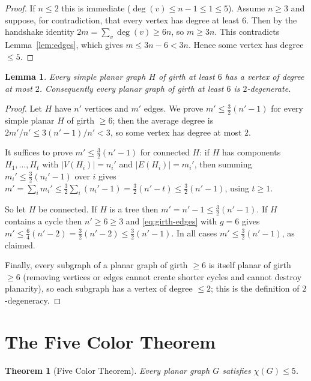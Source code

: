\documentclass{amsart}
\newtheorem{theorem}{Theorem}
\newtheorem{lemma}{Lemma}
\theoremstyle{remark}
\begin{document}
\begin{proof}
If $n\le2$ this is immediate ($\deg(v)\le n-1\le1\le5$). Assume $n\ge3$ and
suppose, for contradiction, that every vertex has degree at least $6$. Then by the
handshake identity $2m=\sum_{v}\deg(v)\ge 6n$, so $m\ge 3n$. This contradicts
Lemma~\ref{lem:edges}, which gives $m\le 3n-6<3n$. Hence some vertex has degree
$\le5$.
\end{proof}

\begin{lemma}\label{lem:girth6deg}
Every simple planar graph $H$ of girth at least $6$ has a vertex of degree at
most $2$. Consequently every planar graph of girth at least $6$ is
$2$-degenerate.
\end{lemma}

\begin{proof}
Let $H$ have $n'$ vertices and $m'$ edges. We prove $m' \le \tfrac32(n'-1)$ for
every simple planar $H$ of girth $\ge6$; then the average degree is
$2m'/n' \le 3(n'-1)/n' < 3$, so some vertex has degree at most $2$.

It suffices to prove $m'\le\tfrac32(n'-1)$ for connected $H$: if $H$ has
components $H_1,\dots,H_t$ with $|V(H_i)|=n_i'$ and $|E(H_i)|=m_i'$, then summing
$m_i'\le\tfrac32(n_i'-1)$ over $i$ gives
$m'=\sum_i m_i'\le \tfrac32\sum_i(n_i'-1)=\tfrac32(n'-t)\le\tfrac32(n'-1)$, using
$t\ge1$.

So let $H$ be connected. If $H$ is a tree then $m'=n'-1\le\tfrac32(n'-1)$. If $H$
contains a cycle then $n'\ge6\ge3$ and \eqref{eq:girth-edges} with $g=6$ gives
$m'\le \tfrac{6}{4}(n'-2)=\tfrac32(n'-2)\le\tfrac32(n'-1)$. In all cases
$m'\le\tfrac32(n'-1)$, as claimed.

Finally, every subgraph of a planar graph of girth $\ge6$ is itself planar of
girth $\ge6$ (removing vertices or edges cannot create shorter cycles and cannot
destroy planarity), so each subgraph has a vertex of degree $\le2$; this is the
definition of $2$-degeneracy.
\end{proof}

\section{The Five Color Theorem}

\begin{theorem}[Five Color Theorem]\label{thm:five}
Every planar graph $G$ satisfies $\chi(G)\le 5$.
\end{theorem}
\end{document}
